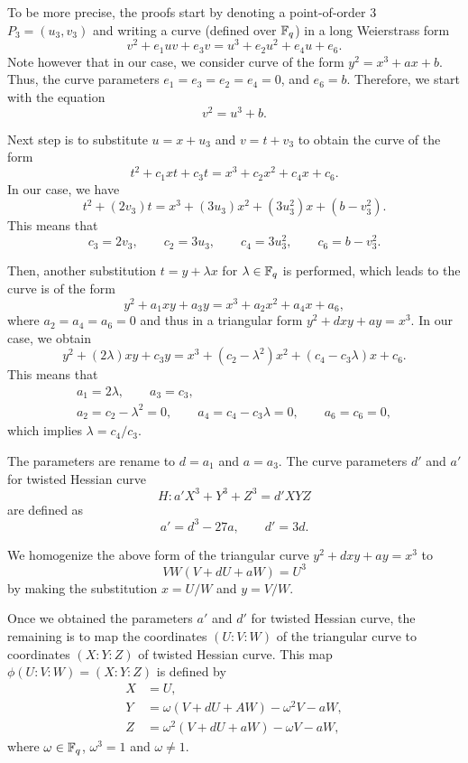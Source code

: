 To be more precise, the proofs start by denoting a point-of-order 3 $P_3 = (u_3,v_3)$ and
writing a curve (defined over $\mathbb{F}_{q}$) in a long Weierstrass form
$$ v^2 + e_1 uv + e_3 v = u^3 + e_2 u^2 + e_4 u + e_6. $$
Note however that in our case, we consider curve of the form $y^2 = x^3 + ax + b$.
Thus, the curve parameters $e_1 = e_3 = e_2 = e_4 = 0$, and $e_6 = b$.
Therefore, we start with the equation
$$v^2 = u^3 + b.$$

Next step is to substitute $u = x + u_3$ and $v = t + v_3$
to obtain the curve of the form
$$ t^2 + c_1 xt + c_3 t = x^3 + c_2 x^2 + c_4 x + c_6. $$
In our case, we have
$$ t^2 + (2v_3)t = x^3 + (3u_3)x^2 + (3u_3^2)x + (b-v_3^2). $$
This means that
$$ c_3 = 2v_3, \qquad c_2 = 3u_3, \qquad c_4 = 3u_3^2, \qquad c_6 = b-v_3^2. $$

Then, another substitution $t = y + \lambda x$ for $\lambda \in \mathbb{F}_{q}$ is performed,
which leads to the curve is of the form
$$ y^2 + a_1 xy + a_3 y = x^3 + a_2 x^2 + a_4 x + a_6, $$
where $a_2 = a_4 = a_6 = 0$ and thus in a triangular form
$y^2 + dxy + ay = x^3$.
In our case, we obtain
$$ y^2 + (2\lambda)xy + c_3 y = x^3 + (c_2 - \lambda^2)x^2 + (c_4 - c_3 \lambda)x + c_6. $$
This means that
\begin{gather*}
a_1 = 2\lambda, \qquad a_3 = c_3, \\
a_2 = c_2 - \lambda^2 = 0, \qquad a_4 = c_4 - c_3 \lambda = 0, \qquad a_6 = c_6 = 0,
\end{gather*}
which implies $\lambda = c_4 / c_3$.

The parameters are rename to $d = a_1$ and $a = a_3$.
The curve parameters $d'$ and $a'$ for twisted Hessian curve
$$ H: a'X^3 + Y^3 + Z^3 = d'XYZ$$
are defined as
$$ a' = d^3 - 27a, \qquad d' = 3d. $$

We homogenize the above form of the triangular curve $y^2 + dxy + ay = x^3$ to
$$ VW(V + dU + aW) = U^3 $$
by making the substitution $x = U/W$ and $y = V/W$.

Once we obtained the parameters $a'$ and $d'$ for twisted Hessian curve,
the remaining is to map the coordinates $(U : V : W)$ of the triangular curve
to coordinates $(X : Y : Z)$ of twisted Hessian curve.
This map $\phi(U:V:W) = (X:Y:Z)$ is defined by
\begin{align*}
X &= U, \\
Y &= \omega(V + dU + AW) - \omega^2 V - aW, \\
Z &= \omega^2 (V + dU + aW) - \omega V - aW,
\end{align*}
where $\omega \in \mathbb{F}_{q}$, $\omega^3 = 1$ and $\omega \ne 1$.

